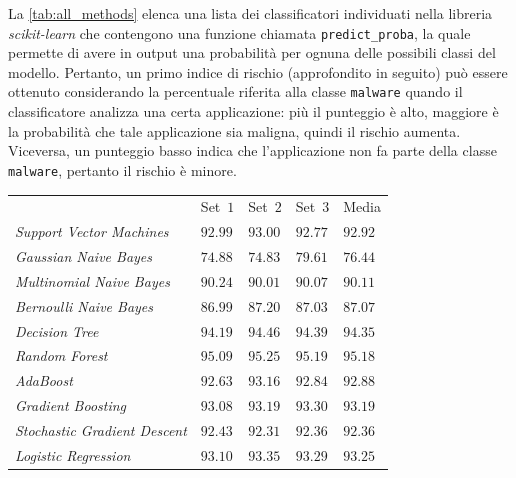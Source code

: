 \documentclass[12pt,a4paper,oneside]{article}
\begin{document}
La \cref{tab:all_methods} elenca una lista dei classificatori individuati nella libreria \mbox{\textit{scikit-learn}} che contengono una funzione chiamata \texttt{predict\_proba}, la quale permette di avere in output una probabilità per ognuna delle possibili classi del modello. Pertanto, un primo indice di rischio (approfondito in seguito) può essere ottenuto considerando la percentuale riferita alla classe \texttt{malware} quando il classificatore analizza una certa applicazione: più il punteggio è alto, maggiore è la probabilità che tale applicazione sia maligna, quindi il rischio aumenta. Viceversa, un punteggio basso indica che l'applicazione non fa parte della classe \texttt{malware}, pertanto il rischio è minore.

\begin{table}[!htb]
    \renewcommand{\arraystretch}{1.3}
    \centering
    \begin{tabular}{|>{\centering\arraybackslash}m{}||>{\centering\arraybackslash}m{}|>{\centering\arraybackslash}m{}|>{\centering\arraybackslash}m{}|>{\centering\arraybackslash}m{}|}
        \hline
        \multirow{2}{*}{Classificatore}
        & \multicolumn{4}{c|}{Accuratezza $\%$}\\\cline{2-5}
        & Set~$1$ & Set~$2$ & Set~$3$ & Media\\
        \hline\hline
        \textit{Support Vector Machines} & $92.99$ & $93.00$ & $92.77$ & $92.92$ \\\hline
        \textit{Gaussian Naive Bayes} & $74.88$ & $74.83$ & $79.61$ & $76.44$ \\\hline
        \textit{Multinomial Naive Bayes} & $90.24$ & $90.01$ & $90.07$ & $90.11$ \\\hline
        \textit{Bernoulli Naive Bayes} & $86.99$ & $87.20$ & $87.03$ & $87.07$ \\\hline
        \textit{Decision Tree} & $94.19$ & $94.46$ & $94.39$ & $94.35$ \\\hline
        \textit{Random Forest} & $95.09$ & $95.25$ & $95.19$ & $95.18$ \\\hline
        \textit{AdaBoost} & $92.63$ & $93.16$ & $92.84$ & $92.88$ \\\hline
        \textit{Gradient Boosting} & $93.08$ & $93.19$ & $93.30$ & $93.19$ \\\hline
        \textit{Stochastic Gradient Descent} & $92.43$ & $92.31$ & $92.36$ & $92.36$ \\\hline
        \textit{Logistic Regression} & $93.10$ & $93.35$ & $93.29$ & $93.25$ \\\hline

\end{tabular}
\end{table}
\end{document}
